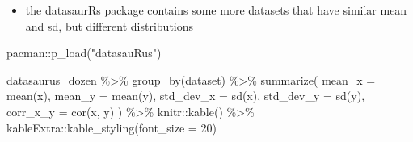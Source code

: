 \documentclass[
  letterpaper,
  DIV=11]{scrartcl}
\newenvironment{Shaded}{\begin{snugshade}}{\end{snugshade}}
\newcommand{\AttributeTok}[1]{\textcolor[rgb]{0.40,0.45,0.13}{#1}}
\newcommand{\DecValTok}[1]{\textcolor[rgb]{0.68,0.00,0.00}{#1}}
\newcommand{\FunctionTok}[1]{\textcolor[rgb]{0.28,0.35,0.67}{#1}}
\newcommand{\NormalTok}[1]{\textcolor[rgb]{0.00,0.23,0.31}{#1}}
\newcommand{\SpecialCharTok}[1]{\textcolor[rgb]{0.37,0.37,0.37}{#1}}
\newcommand{\StringTok}[1]{\textcolor[rgb]{0.13,0.47,0.30}{#1}}
\providecommand{\tightlist}{%
  \setlength{\itemsep}{0pt}\setlength{\parskip}{0pt}}\usepackage{longtable,booktabs,array}
\begin{document}
\begin{itemize}
\tightlist
\item
  the datasaurRs package contains some more datasets that have similar
  mean and sd, but different distributions
\end{itemize}

\begin{Shaded}
\begin{Highlighting}[]
\NormalTok{pacman}\SpecialCharTok{::}\FunctionTok{p\_load}\NormalTok{(}\StringTok{"datasauRus"}\NormalTok{)}
\end{Highlighting}
\end{Shaded}

\begin{Shaded}
\begin{Highlighting}[]
\NormalTok{datasaurus\_dozen }\SpecialCharTok{\%\textgreater{}\%} 
    \FunctionTok{group\_by}\NormalTok{(dataset) }\SpecialCharTok{\%\textgreater{}\%} 
    \FunctionTok{summarize}\NormalTok{(}
      \AttributeTok{mean\_x    =} \FunctionTok{mean}\NormalTok{(x),}
      \AttributeTok{mean\_y    =} \FunctionTok{mean}\NormalTok{(y),}
      \AttributeTok{std\_dev\_x =} \FunctionTok{sd}\NormalTok{(x),}
      \AttributeTok{std\_dev\_y =} \FunctionTok{sd}\NormalTok{(y),}
      \AttributeTok{corr\_x\_y  =} \FunctionTok{cor}\NormalTok{(x, y)}
\NormalTok{    ) }\SpecialCharTok{\%\textgreater{}\%} 
\NormalTok{  knitr}\SpecialCharTok{::}\FunctionTok{kable}\NormalTok{() }\SpecialCharTok{\%\textgreater{}\%} 
\NormalTok{  kableExtra}\SpecialCharTok{::}\FunctionTok{kable\_styling}\NormalTok{(}\AttributeTok{font\_size =} \DecValTok{20}\NormalTok{)}
\end{Highlighting}
\end{Shaded}
\end{document}
